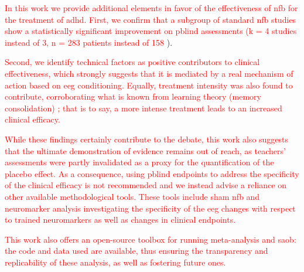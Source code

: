 \textcolor{red}{In this work we provide additional elements in favor of the effectiveness of \gls{nfb} for the treatment of \gls{adhd}. First, 
we confirm that a subgroup of standard \gls{nfb} studies show a statistically significant improvement on \gls{pblind} 
assessments (k = 4 studies instead of 3, n = 283 patients instead of 158} \citet{Cortese2016}). 

\textcolor{red}{Second, we identify technical factors as positive contributors to clinical effectiveness, which strongly suggests 
that it is mediated by a real mechanism of action based on \gls{eeg} conditioning. Equally, treatment intensity was also found to 
contribute, corroborating what is known from learning theory (memory consolidation)} \citep{Mowrer1960}\textcolor{red}{; that is to say, a more intense treatment leads to 
an increased clinical efficacy.}

\textcolor{red}{While these findings certainly contribute to the debate, this work also suggests that the ultimate demonstration of evidence 
remains out of reach, as teachers’ assessments were partly invalidated as a proxy for the quantification of the placebo effect. 
As a consequence, using \gls{pblind} endpoints to address the specificity of the clinical efficacy is not recommended 
and we instead advise a reliance on other available methodological tools. These tools include sham \gls{nfb} and neuromarker 
analysis investigating the specificity of the \gls{eeg} changes with respect to trained neuromarkers as well as changes 
in clinical endpoints.}

\textcolor{red}{This work also offers an open-source toolbox for running meta-analysis and \gls{saob}: the code and data used are available, 
thus ensuring the transparency and replicability of these analysis, as well as fostering future ones.}

